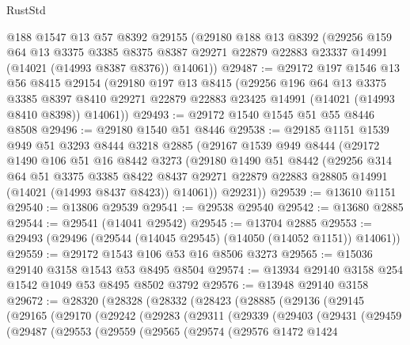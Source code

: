 \begin{lexlean}{RustStd}
\begin{coremodule}
    @188
    @1547
    @13
    @57
    @8392
    @29155
    (@29180
      @188
      @13
      @8392
      (@29256
        @159
        @64
        @13
        @3375
        @3385
        @8375
        @8387
        @29271
        @22879
        @22883
        @23337
        @14991
        (@14021 (@14993 @8387 @8376))
        @14061))
@29487 := @29172
    @197
    @1546
    @13
    @56
    @8415
    @29154
    (@29180
      @197
      @13
      @8415
      (@29256
        @196
        @64
        @13
        @3375
        @3385
        @8397
        @8410
        @29271
        @22879
        @22883
        @23425
        @14991
        (@14021 (@14993 @8410 @8398))
        @14061))
@29493 := @29172 @1540 @1545 @51 @55 @8446 @8508
@29496 := @29180 @1540 @51 @8446
@29538 := @29185
    @1151
    @1539
    @949
    @51
    @3293
    @8444
    @3218
    @2885
    (@29167
      @1539
      @949
      @8444
      (@29172
        @1490
        @106
        @51
        @16
        @8442
        @3273
        (@29180
          @1490
          @51
          @8442
          (@29256
            @314
            @64
            @51
            @3375
            @3385
            @8422
            @8437
            @29271
            @22879
            @22883
            @28805
            @14991
            (@14021 (@14993 @8437 @8423))
            @14061))
        @29231))
@29539 := @13610 @1151
@29540 := @13806 @29539
@29541 := @29538 @29540
@29542 := @13680 @2885
@29544 := @29541 (@14041 @29542)
@29545 := @13704 @2885
@29553 := @29493 (@29496 (@29544 (@14045 @29545) (@14050 (@14052 @1151)) @14061))
@29559 := @29172 @1543 @106 @53 @16 @8506 @3273
@29565 := @15036 @29140 @3158 @1543 @53 @8495 @8504
@29574 := @13934 @29140 @3158 @254 @1542 @1049 @53 @8495 @8502 @3792
@29576 := @13948 @29140 @3158
@29672 := @28320
    (@28328
      (@28332
        (@28423
          (@28885
            (@29136
              (@29145
                (@29165
                  (@29170
                    (@29242
                      (@29283
                        (@29311
                          (@29339
                            (@29403
                              (@29431
                                (@29459
                                  (@29487
                                    (@29553
                                      (@29559
                                        (@29565
                                          (@29574
                                            (@29576
                                              @1472
                                              @1424

\end{coremodule}
\end{lexlean}
